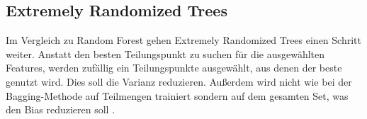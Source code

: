 \subsection{Extremely Randomized Trees}
Im Vergleich zu Random Forest gehen Extremely Randomized Trees einen Schritt weiter. Anstatt den besten Teilungspunkt zu suchen für die ausgewählten Features, werden zufällig ein Teilungspunkte ausgewählt, aus denen
der beste genutzt wird. Dies soll die Varianz reduzieren. Außerdem wird nicht wie bei der Bagging-Methode auf Teilmengen trainiert sondern auf dem gesamten Set, was den Bias reduzieren soll \cite{geurts2006extremely}.